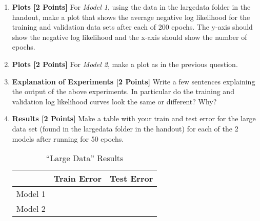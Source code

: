\begin{enumerate}
    
\item {\bf Plots [2 Points]} 
For \emph{Model 1}, using the data in the largedata folder in the handout, make a plot that shows the average negative log likelihood for the training and validation data sets after each of 200 epochs. The y-axis should show the negative log likelihood and the x-axis should show the number of epochs.  

\begin{solution}
    \bigskip \bigskip \bigskip \bigskip \bigskip \bigskip \bigskip \bigskip
    \bigskip \bigskip \bigskip \bigskip \bigskip \bigskip \bigskip \bigskip
\end{solution}

\item {\bf Plots [2 Points]} 
For \emph{Model 2}, make a plot as in the previous question.
        
\begin{solution}
    \bigskip \bigskip \bigskip \bigskip \bigskip \bigskip \bigskip \bigskip
    \bigskip \bigskip \bigskip \bigskip \bigskip \bigskip \bigskip \bigskip
    \bigskip \bigskip \bigskip \bigskip \bigskip \bigskip \bigskip \bigskip
\end{solution}
\clearpage


\item {\bf Explanation of Experiments [2 Points]}
Write a few sentences explaining the output of the above experiments. In particular do the training and validation log likelihood curves look the same or different? Why?

\begin{solution}
    \bigskip \bigskip \bigskip \bigskip \bigskip \bigskip \bigskip \bigskip
    \bigskip \bigskip \bigskip \bigskip \bigskip \bigskip \bigskip \bigskip
\end{solution}

\item {\bf Results [2 Points]} 
Make a table with your train and test error for the large data set (found in the largedata folder in the handout) for each of the 2 models after running for 50 epochs.

\begin{solution}
     \begin{table}[H]
        \centering
        \begin{tabular}{l|l|l}
        \toprule
        & Train Error & Test Error \\ 
        \midrule
        Model 1      &         &         \\ 
        Model 2 &         &         \\ 
        \bottomrule
        \end{tabular}
        \caption{``Large Data'' Results}
        \label{results}
    \end{table}
\end{solution}

\end{enumerate}

